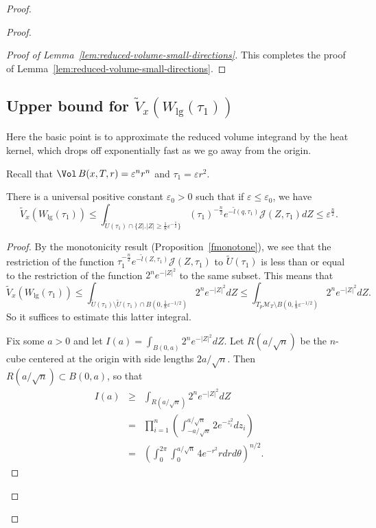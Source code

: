 \begin{proof}
\begin{proof}
\begin{proof}[Proof of Lemma~\ref{lem:reduced-volume-small-directions}]
This completes the proof of Lemma~\ref{lem:reduced-volume-small-directions}.
\end{proof}


\subsection{Upper bound for $\widetilde V_x( W_{\mathrm{lg}}(\tau_1))$}

Here the basic point is to approximate the reduced volume integrand
by the heat kernel, which drops off exponentially fast as we go away
from the origin.




Recall that $\Vol\,B(x,T,r)=\varepsilon^nr^n$ and
$\tau_1=\varepsilon r^2$.

\begin{lemma}\label{lem:reduced-volume-large-directions}
\label{large}
There is a universal positive constant $\varepsilon_0>0$ such that
if $\varepsilon\le \varepsilon_0$, we have
$$
\widetilde V_x(W_{\mathrm{lg}}(\tau_1)) \le  \int_{{\widetilde
U}(\tau_1)\cap \{Z\bigl|\bigr. |Z|\geq
\frac{1}{8}\varepsilon^{-\frac{1}{2}}\}}(\tau_1)^{-\frac{n}{2}}
e^{-\tilde l(q,\tau_1)}\mathcal{J}(Z,\tau_1)dZ\le
\varepsilon^{\frac{n}{2}}.$$
\end{lemma}

\begin{proof}
By the monotonicity result (Proposition~\ref{fmonotone}), we see
that the restriction of the function
$\tau_1^{-\frac{n}{2}}e^{-\tilde l(Z,\tau_1)}{\mathcal J}(Z,\tau_1)$
to ${\widetilde U}(\tau_1)$ is less than or equal to the restriction
of the function $2^ne^{-|Z|^2}$ to the same subset. This means that
$$\widetilde V_x(W_{\mathrm{lg}}(\tau_1))\le \int_{{\widetilde U}(\tau_1)\setminus
\widetilde U(\tau_1)\cap B(0,\frac{1}{8}\varepsilon^{-1/2})}2^n
e^{-|Z|^2}dZ\le \int_{T_p{\mathcal M}_T\setminus
B(0,\frac{1}{8}\varepsilon^{-1/2})}2^ne^{-|Z|^2}dZ.$$ So it suffices
to estimate this latter integral.

Fix some $a>0$ and  let $I(a)=\int_{B(0,a)}2^ne^{-|Z|^2}dZ$. Let
$R(a/\sqrt{n})$ be the $n$-cube centered at the origin with side
lengths $2a/\sqrt{n}$. Then $R(a/\sqrt{n})\subset B(0,a)$, so that
\begin{eqnarray*}
I(a) & \ge  & \int_{R(a/\sqrt{n})}2^ne^{-|Z|^2}dZ \\
& = & \prod_{i=1}^n
\left(\int_{-a/\sqrt{n}}^{a/\sqrt{n}}2e^{-z_i^2}dz_i\right)
\\
& = &
\left(\int_0^{2\pi}\int_0^{a/\sqrt{n}}4e^{-r^2}rdrd\theta\right)^{n/2}.
\end{eqnarray*}


\end{proof}
\end{proof}
\end{proof}
